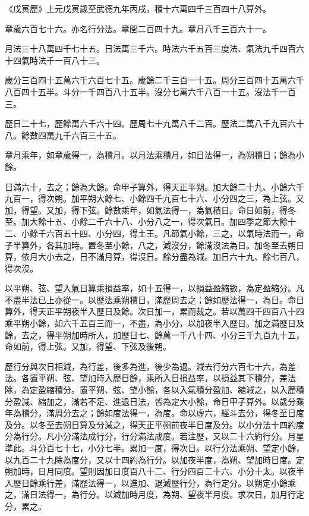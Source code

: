 \begin{pinyinscope}
 《戊寅歷》上元戊寅歲至武德九年丙戌，積十六萬四千三百四十八算外。



 章歲六百七十六。亦名行分法。章閏二百四十九。章月八千三百六十一。



 月法三十八萬四千七十五。日法萬三千六。時法六千五百三度法、氣法九千四百六十四氣時法千一百八十三。



 歲分三百四十五萬六千六百七十五。歲餘二千三百一十五。周分三百四十五萬六千八百四十五半。斗分一千四百八十五半。沒分七萬六千八百一十五。沒法千一百三。



 歷日二十七，歷餘萬六千六十四。歷周七十九萬八千二百。歷法二萬八千九百六十八。餘數四萬九千六百三十五。



 章月乘年，如章歲得一，為積月。以月法乘積月，如日法得一，為朔積日；餘為小餘。



 日滿六十，去之；餘為大餘。命甲子算外，得天正平朔。加大餘二十九、小餘六千九百一，得次朔。加平朔大餘七、小餘四千九百七十六、小分四之三，為上弦。又加，得望。又加，得下弦。餘數乘年，如氣法得一，為氣積日。命日如前，得冬至。加大餘十五、小餘二千六十八、小分八之一，得次氣日。加四季之節大餘十二、小餘千六百五十四、小分四，得土王。凡節氣小餘，三之，以氣時法而一，命子半算外，各其加時。置冬至小餘，八之，減沒分，餘滿沒法為日。加冬至去朔日算，依月大小去之，日不滿月算，得沒日。餘分盡為減。加日六十九、餘七百八，得次沒。



 以平朔、弦、望入氣日算乘損益率，如十五得一，以損益盈縮數，為定盈縮分。凡不盡半法已上亦從一。以歷法乘朔積日，滿歷周去之；餘如歷法得一，為日。命日算外，得天正平朔夜半入歷日及餘。次日加一，累而裁之。若以萬四千四百八十四乘平朔小餘，如六千五百三而一，不盡，為小分，以加夜半入歷日。加之滿歷日及餘，去之，得平朔加時所入，加歷日七、餘萬一千八十四、小分三千九百九十五，命如前，得上弦。又加，得望、下弦及後朔。



 歷行分與次日相減，為行差，後多為進，後少為退。減去行分六百七十六，為差法。各置平朔、弦、望加時入歷日餘，乘所入日損益率，以損益其下積分，差法除，為定盈縮積分。置平朔、弦、望小餘，各以入氣積分盈加、縮減之，以入歷積分盈減、縮加之，滿若不足、進退日法，皆為定大小餘，命日甲子算外。以歲分乘年為積分，滿周分去之；餘如度法得一，為度。命以虛六，經斗去分，得冬至日度及分。以冬至去朔日算及分減之，得天正平朔前夜半日度及分。以小分法十四約度分為行分。凡小分滿法成行分，行分滿法成度。若注歷，又以二十六約行分。月星準此。斗分百七十七，小分七半。累加一度，得次日。以行分法乘朔、望定小餘，以九百二十九除為度分，又以十四約為行分。以加夜半度，為朔、望加時日度。定朔加時，日月同度。望則因加日度百八十二、行分四百二十六、小分十太。以夜半入歷日餘乘行差，滿歷法得一，以進加、退減歷行分，為行定分。以朔定小餘乘之，滿日法得一，為行分。以減加時月度，為朔、望夜半月度。求次日，加月行定分，累之。




\end{pinyinscope}
